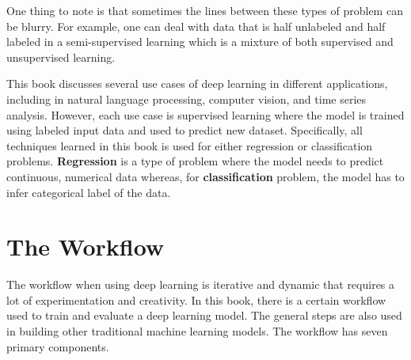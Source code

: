 \documentclass[
  letterpaper,
  DIV=11,
  numbers=noendperiod]{scrreprt}
\begin{document}
One thing to note is that sometimes the lines between these types of
problem can be blurry. For example, one can deal with data that is half
unlabeled and half labeled in a semi-supervised learning which is a
mixture of both supervised and unsupervised learning.

This book discusses several use cases of deep learning in different
applications, including in natural language processing, computer vision,
and time series analysis. However, each use case is supervised learning
where the model is trained using labeled input data and used to predict
new dataset. Specifically, all techniques learned in this book is used
for either regression or classification problems. \textbf{Regression} is
a type of problem where the model needs to predict continuous, numerical
data whereas, for \textbf{classification} problem, the model has to
infer categorical label of the data.

\hypertarget{the-workflow}{%
\section{The Workflow}\label{the-workflow}}

The workflow when using deep learning is iterative and dynamic that
requires a lot of experimentation and creativity. In this book, there is
a certain workflow used to train and evaluate a deep learning model. The
general steps are also used in building other traditional machine
learning models. The workflow has seven primary components.
\end{document}
